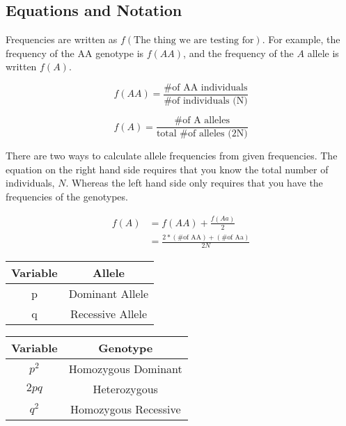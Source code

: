 \documentclass[12pt]{article}
\begin{document}
\subsection{Equations and Notation}

Frequencies are written as $f(\text{The thing we are testing for})$. For example, the frequency of the AA genotype is $f(AA)$, and the frequency of the $A$ allele is written $f(A)$.

\begin{equation}\label{faa}
    f(AA) = \frac{\text{\# of AA individuals}}{\text{\# of individuals (N)}}
\end{equation}

\begin{equation}\label{fa-simple}
    f(A) = \frac{\text{\# of A alleles}}{\text{total \# of alleles (2N)}}
\end{equation}

There are two ways to calculate allele frequencies from given frequencies. The equation on the right hand side requires that you know the total number of individuals, $N$. Whereas the left hand side only requires that you have the frequencies of the genotypes.

\begin{align}
    f(A) &= f(AA) + \frac{f(Aa)}{2} \label{fa-freq} \\
    &= \frac{2*(\text{\# of AA}) + (\text{\# of Aa})}{2N} \label{fa-count}
\end{align}

\begin{table}[h!]
    \centering
    \begin{tabular}{| c | c |}
        \hline
        Variable & Allele           \\\hline
        p        & Dominant Allele  \\
        q        & Recessive Allele \\\hline
    \end{tabular}
    \begin{tabular}{| c | c |}
        \hline
        Variable & Genotype             \\\hline
        $p^2$    & Homozygous Dominant  \\
        $2pq$    & Heterozygous         \\
        $q^2$    & Homozygous Recessive \\\hline
    \end{tabular}
\end{table}
\end{document}
